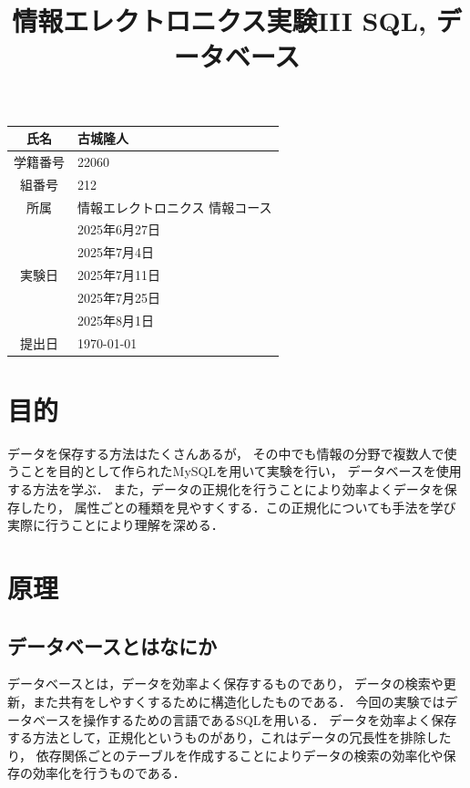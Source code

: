 \documentclass[a4paper,11pt]{ltjsarticle}
\begin{document}
\title{情報エレクトロニクス実験I\hspace{-1.2pt}I\hspace{-1.2pt}I SQL, データベース}
\author{\empty}
\date{\empty}
\maketitle
\begin{table}[b]
  \centering
  \begin{tabular}{|c|l|}
    \hline
    氏名                   & 古城隆人             \\
    \hline
    学籍番号                 & 22060            \\
    \hline
    組番号                  & 212              \\
    \hline
    所属                   & 情報エレクトロニクス 情報コース \\
    \hline
    \multirow{5}{*}{実験日} & 2025年6月27日       \\
                         & 2025年7月4日        \\
                         & 2025年7月11日       \\
                         & 2025年7月25日       \\
                         & 2025年8月1日        \\
    \hline
    提出日                  & \today           \\
    \hline
  \end{tabular}
\end{table}
\newpage
\clearpage
\section{目的}
データを保存する方法はたくさんあるが，
その中でも情報の分野で複数人で使うことを目的として作られたMySQLを用いて実験を行い，
データベースを使用する方法を学ぶ．
また，データの正規化を行うことにより効率よくデータを保存したり，
属性ごとの種類を見やすくする．この正規化についても手法を学び実際に行うことにより理解を深める．
\section{原理}
\subsection{データベースとはなにか}
データベースとは，データを効率よく保存するものであり，
データの検索や更新，また共有をしやすくするために構造化したものである．
今回の実験ではデータベースを操作するための言語であるSQLを用いる．
データを効率よく保存する方法として，正規化というものがあり，これはデータの冗長性を排除したり，
依存関係ごとのテーブルを作成することによりデータの検索の効率化や保存の効率化を行うものである．
\end{document}
